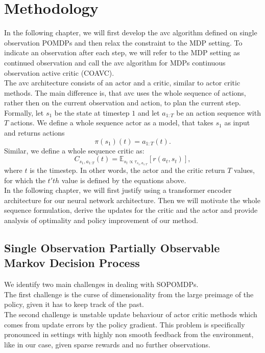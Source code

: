 
\chapter{Methodology}
\label{chapter:Methodology}
In the following chapter, we will first develop the \ac{avc} algorithm defined on single observation POMDPs and then relax 
the constraint to the MDP setting. To indicate an observation after each step, we will refer to the MDP setting as continued observation 
and call the \ac{avc} algorithm for MDPs continuous observation active critic (COAVC).\\

The \ac{avc} architecture consists of an actor and a critic, similar to actor critic methods. The main difference is, that \ac{avc} uses the whole sequence of 
actions, rather then on the current observation and action, to plan the current step.\\ 

Formally, let $s_{1}$ be the state at timestep $1$ and let $a_{1:T}$ be an action sequence with $T$ actions. 
We define a whole sequence actor as a model, that takes $s_{1}$ as input and returns actions 
\begin{equation}
    \label{eq:def_wsa}
    \pi(s_{1})(t) = a_{1:T}(t).
\end{equation}
Similar, we define a whole sequence critic as: 
\begin{equation}
    \label{eq:def_wsc}
    C_{s_1, a_{1:T}}(t) = \mathbb{E}_{s_t \propto \tau_{s_1, a_{1:T}}}\left[r(a_t, s_t)\right],
\end{equation}
where $t$ is the timestep. In other words, the actor and the critic return $T$ values, for which the $t'th$ value is defined by the 
equations above.\\

In the following chapter, we will first justify using a transformer encoder architecture for our neural network architecture. 
Then we will motivate the whole sequence formulation, derive the updates for the critic and the 
actor and provide analysis of optimality and policy improvement of our method. 

\section{Single Observation Partially Observable Markov Decision Process}
We identify two main challenges in dealing with SOPOMDPs. \\
The first challenge is the curse of dimensionality from the large preimage of the policy, given it has to keep track 
of the past. \\
The second challenge is unstable update behaviour of actor critic methods which comes from update errors by the policy gradient. This problem 
is specifically pronounced in settings with highly non smooth feedback from the environment, like in our case, given sparse rewards 
and no further observations.
